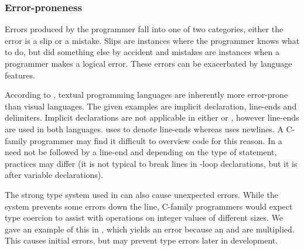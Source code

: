 \subsubsection{Error-proneness}
Errors produced by the programmer fall into one of two categories, either the error is a slip or a mistake. Slips are instances where the programmer knows what to do, but did something else by accident and mistakes are instances when a programmer makes a logical error. These errors can be exacerbated by language features.

According to \cite{green1996usability}, textual programming languages are inherently more error-prone than visual languages. The given examples are implicit declaration, line-ends and delimiters. Implicit declarations are not applicable in either \cs or \fs, however line-ends are used in both languages. \cs uses \m{;} to denote line-ends whereas \fs uses newlines. A C-family programmer may find it difficult to overview \fs code for this reason. In \cs a \m{;} need not be followed by a line-end and depending on the type of statement, practices may differ (it is not typical to break lines in -loop declarations, but it is after variable declarations).


The strong type system used in \fs can also cause unexpected errors. While the system prevents some errors down the line, C-family programmers would expect type coercion to assist with operations on integer values of different sizes. We gave an example of this in , which yields an error because an  and  are multiplied. This causes initial errors, but may prevent type errors later in development\cite{ray2014large}.


